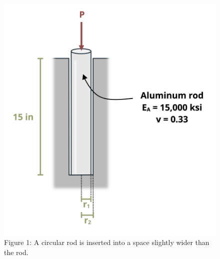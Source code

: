 \documentclass[
  letterpaper,
  DIV=11,
  numbers=noendperiod]{scrreprt}
\begin{document}
\begin{figure}[H]

{\centering \includegraphics{images/213.png}

}

\caption{Figure 1: A circular rod is inserted into a space slightly
wider than the rod.}

\end{figure}%
\end{document}
